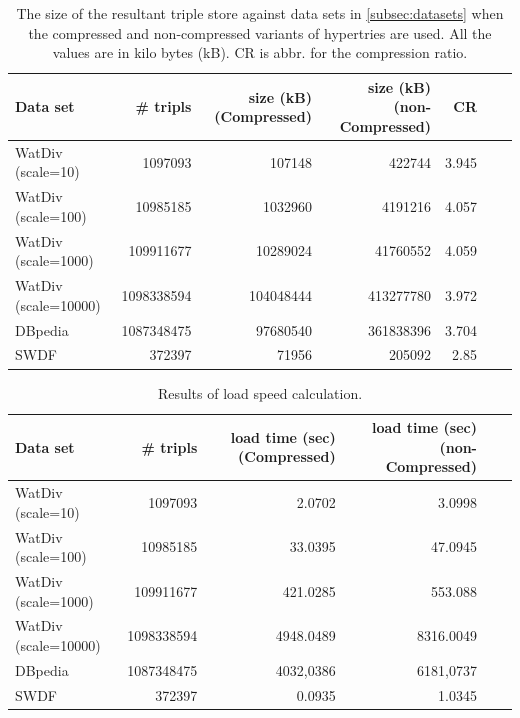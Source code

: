 \begin{table}[h]
	\setlength{\tabcolsep}{1ex}
	\begin{tabular}{lrrrrrl}
		\toprule
		Data set& \# tripls & size (kB) (Compressed) &size (kB) (non-Compressed)& CR\\
		\midrule
		WatDiv (scale=10) &  1097093& 	107148	& 422744& 	3.945 \\ %
		WatDiv (scale=100) & 10985185&	1032960	&4191216&	4.057  \\ %
		WatDiv (scale=1000) & 109911677	&10289024&	41760552&	4.059 \\ 
		WatDiv (scale=10000) & 1098338594&	104048444	&413277780&	3.972\\ 
		DBpedia  & 1087348475	&97680540&	361838396&	3.704&\\ 
		SWDF  & 372397&	71956&	205092	&2.85\\ 
		\bottomrule
	\end{tabular}
	\caption{The size of the resultant triple store against data sets in \ref{subsec:datasets} when the compressed and non-compressed variants of hypertries are used. All the values are in kilo bytes (kB). CR is abbr. for the compression ratio.}
	\label{tab:result_table_size}
\end{table}

\begin{table}[h]
	\setlength{\tabcolsep}{1ex}
	\begin{tabular}{lrrrrl}
		\toprule
		Data set& \# tripls & load time (sec) (Compressed) & load time (sec) (non-Compressed) \\
		\midrule
		WatDiv (scale=10) &  1097093& 	2.0702	& 3.0998 \\ %
		WatDiv (scale=100) & 10985185&	33.0395	& 47.0945  \\ %
		WatDiv (scale=1000) & 109911677	&421.0285	& 553.088 \\ 
		WatDiv (scale=10000)& 1098338594 & 4948.0489	& 8316.0049\\ 
		DBpedia  & 1087348475	&4032,0386& 	6181,0737\\ 
		SWDF  & 372397&	0.0935& 1.0345\\ 
		\bottomrule
	\end{tabular}
	\caption{Results of load speed calculation.}
	\label{tab:result_table_load_speed}
\end{table}

